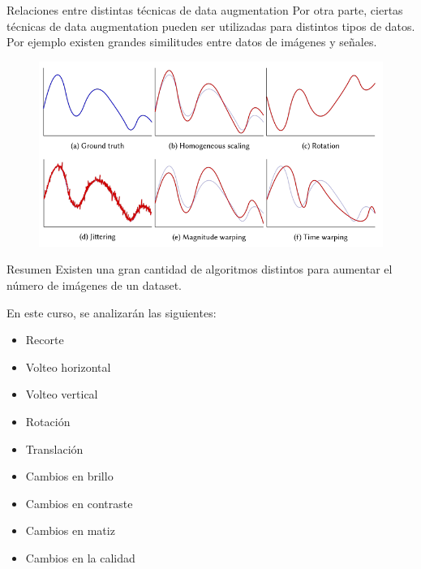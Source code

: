 \begin{frame}{Relaciones entre distintas técnicas de data augmentation}
Por otra parte, ciertas técnicas de data augmentation pueden ser utilizadas para \alert{distintos tipos de datos}. Por ejemplo existen grandes \alert{similitudes} entre datos de \alert{imágenes} y \alert{señales}.

\begin{figure}
    \centering
    \includegraphics[width=\textwidth]{figures/Tema 3/DA_Signals.png}
    \caption{\cite{iglesias2023data}}
\end{figure}
\end{frame}

\begin{frame}{Resumen}
Existen una gran cantidad de algoritmos distintos para aumentar el número de imágenes de un dataset.

En este curso, se analizarán las siguientes:
\begin{itemize}
    \item \alert{Recorte}
    \item \alert{Volteo horizontal}
    \item \alert{Volteo vertical}
    \item \alert{Rotación}
    \item \alert{Translación}
    \item \alert{Cambios en brillo}
    \item \alert{Cambios en contraste}
    \item \alert{Cambios en matiz}
    \item \alert{Cambios en la calidad}
\end{itemize}
\end{frame}

